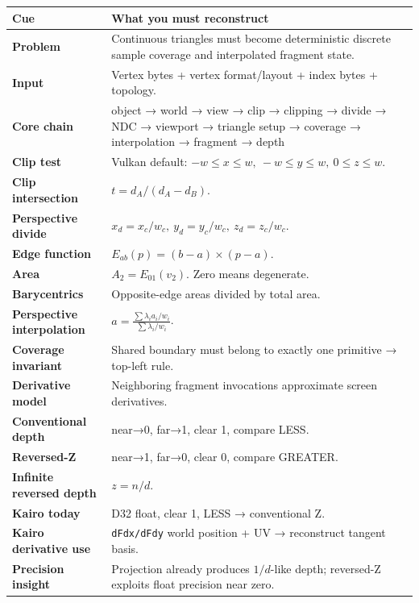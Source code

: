 {\def\LTcaptype{none} %
\begin{longtable}[]{@{}
  >{\raggedright\arraybackslash}p{}
  >{\raggedright\arraybackslash}p{}@{}}
\toprule\noalign{}
\begin{minipage}[b]{\linewidth}\raggedright
Cue
\end{minipage} & \begin{minipage}[b]{\linewidth}\raggedright
What you must reconstruct
\end{minipage} \\
\midrule\noalign{}
\endhead
\bottomrule\noalign{}
\endlastfoot
\textbf{Problem} & Continuous triangles must become deterministic discrete sample coverage and interpolated fragment state. \\
\textbf{Input} & Vertex bytes + vertex format/layout + index bytes + topology. \\
\textbf{Core chain} & object → world → view → clip → clipping → divide → NDC → viewport → triangle setup → coverage → interpolation → fragment → depth \\
\textbf{Clip test} & Vulkan default: \(-w\le x\le w,\ -w\le y\le w,\ 0\le z\le w\). \\
\textbf{Clip intersection} & \(t=d_A/(d_A-d_B)\). \\
\textbf{Perspective divide} & \(x_d=x_c/w_c,\ y_d=y_c/w_c,\ z_d=z_c/w_c\). \\
\textbf{Edge function} & \(E_{ab}(p)=(b-a)\times(p-a)\). \\
\textbf{Area} & \(A_2=E_{01}(v_2)\). Zero means degenerate. \\
\textbf{Barycentrics} & Opposite-edge areas divided by total area. \\
\textbf{Perspective interpolation} & \(a=\frac{\sum\lambda_i a_i/w_i}{\sum\lambda_i/w_i}\). \\
\textbf{Coverage invariant} & Shared boundary must belong to exactly one primitive → top-left rule. \\
\textbf{Derivative model} & Neighboring fragment invocations approximate screen derivatives. \\
\textbf{Conventional depth} & near→0, far→1, clear 1, compare LESS. \\
\textbf{Reversed-Z} & near→1, far→0, clear 0, compare GREATER. \\
\textbf{Infinite reversed depth} & \(z=n/d\). \\
\textbf{Kairo today} & D32 float, clear 1, LESS → conventional Z. \\
\textbf{Kairo derivative use} & \texttt{dFdx/dFdy} world position + UV → reconstruct tangent basis. \\
\textbf{Precision insight} & Projection already produces \(1/d\)-like depth; reversed-Z exploits float precision near zero. \\
\end{longtable}
}

